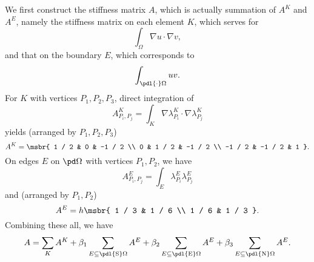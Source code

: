\documentclass[english, nochinese]{pnote}
\begin{document}
We first construct the stiffness matrix $A$, which is actually summation of $A^K$ and $A^E$, namely the stiffness matrix on each element $K$, which serves for
\begin{equation}
\int_{\Omega} \nabla u \cdot \nabla v,
\end{equation}
and that on the boundary $E$, which corresponds to
\begin{equation}
\int_{ \pdl{\cdot} \Omega } u v.
\end{equation}
For $K$ with vertices $ P_1, P_2, P_3 $, direct integration of
\begin{equation}
A^K_{ P_i, P_j } = \int_K \nabla \lambda_{P_i}^K \cdot \nabla \lambda_{P_j}^K
\end{equation}
yields (arranged by $ P_1, P_2, P_3 $)
\begin{equation}
A^K = \msbr{ 1 / 2 & 0 & -1 / 2 \\ 0 & 1 / 2 & -1 / 2 \\ -1 / 2 & -1 / 2 & 1 }.
\end{equation}
On edges $E$ on $ \pd \Omega $ with vertices $ P_1, P_2 $, we have
\begin{equation}
A^E_{ P_i, P_j } = \int_E \lambda_{P_i}^E \lambda_{P_j}^E
\end{equation}
and (arranged by $ P_1, P_2 $)
\begin{equation}
A^E = h \msbr{ 1 / 3 & 1 / 6 \\ 1 / 6 & 1 / 3 }.
\end{equation}
Combining these all, we have
\begin{equation}
A = \sum_K A^K + \beta_1 \sum_{ E \subseteq \pdl{\text{S}} \Omega } A^E + \beta_2 \sum_{ E \subseteq \pdl{\text{E}} \Omega } A^E + \beta_3 \sum_{ E \subseteq \pdl{\text{N}} \Omega } A^E.
\end{equation}
\end{document}
